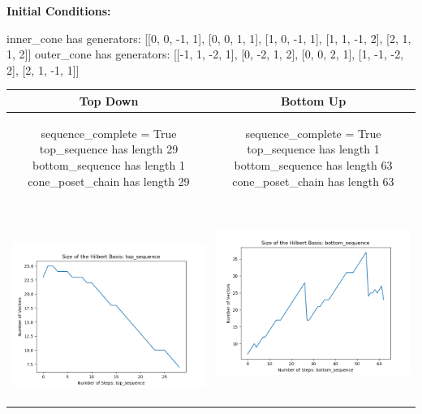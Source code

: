 \documentclass[10pt]{article}
\begin{document}
\textbf{Initial Conditions:}
\begin{SAGE}
inner_cone has generators: 
[[0, 0, -1, 1], [0, 0, 1, 1], [1, 0, -1, 1], [1, 1, -1, 2], [2, 1, 1, 2]]
outer_cone has generators: 
[[-1, 1, -2, 1], [0, -2, 1, 2], [0, 0, 2, 1], [1, -1, -2, 2], [2, 1, -1, 1]]

\end{SAGE}
\begin{tabular}{c|c}
\textbf{Top Down} & \textbf{Bottom Up} \\ \hline  
\begin{SAGE}
	sequence_complete = True
	top_sequence has length 29
	bottom_sequence has length 1
	cone_poset_chain has length 29
\end{SAGE} 
&
\begin{SAGE}
	sequence_complete = True
	top_sequence has length 1
	bottom_sequence has length 63
	cone_poset_chain has length 63
\end{SAGE} 
\\ \hline
\
\begin{minipage}{.45\textwidth}
\includegraphics[width=\textwidth]{"DATA/4d/5 generators 2 bound F/top_sequence SIZE"}
\end{minipage} &
\begin{minipage}{.45\textwidth}
\includegraphics[width=\textwidth]{"DATA/4d/5 generators 2 bound F bottomup/bottom_sequence SIZE"}

\end{minipage}
\end{tabular}
\end{document}
